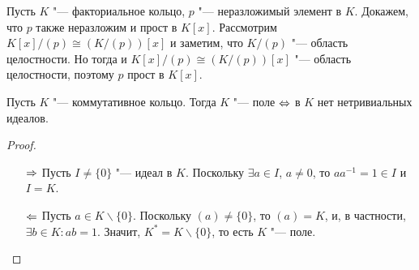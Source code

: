 \begin{example}
	Пусть $K$ "--- факториальное кольцо, $p$ "--- неразложимый элемент в $K$. Докажем, что $p$ также неразложим и прост в $K[x]$. Рассмотрим $K[x] / (p) \cong (K / (p))[x]$ и заметим, что $K / (p)$ "--- область целостности. Но тогда и $K[x] / (p) \cong (K / (p))[x]$ "--- область целостности, поэтому $p$ прост в $K[x]$.
\end{example}

\begin{proposition}
	Пусть $K$ "--- коммутативное кольцо. Тогда $K$ "--- поле $\Leftrightarrow$ в $K$ нет нетривиальных идеалов.
\end{proposition}

\begin{proof}~
	\begin{itemize}
		\item[$\Rightarrow$] Пусть $I \ne \{0\}$ "--- идеал в $K$. Поскольку $\exists a \in I$, $a \ne 0$, то $aa^{-1} = 1 \in I$ и $I = K$.
		\item[$\Leftarrow$] Пусть $a \in K \backslash \{0\}$. Поскольку $(a) \ne \{0\}$, то $(a) = K$, и, в частности, $\exists b \in K: ab = 1$. Значит, $K^* = K \backslash \{0\}$, то есть $K$ "--- поле.\qedhere
	\end{itemize}
\end{proof}